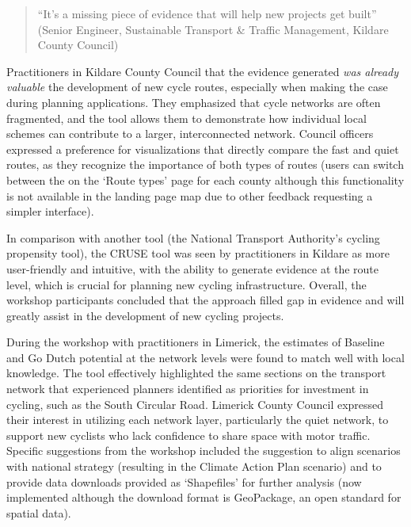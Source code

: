 \documentclass[
  super,
  preprint,
  3p]{elsarticle}
\begin{document}
\begin{quote}
``It's a missing piece of evidence that will help new projects get
built'' (Senior Engineer, Sustainable Transport \& Traffic Management,
Kildare County Council)
\end{quote}

Practitioners in Kildare County Council that the evidence generated
\emph{was already valuable} the development of new cycle routes,
especially when making the case during planning applications. They
emphasized that cycle networks are often fragmented, and the tool allows
them to demonstrate how individual local schemes can contribute to a
larger, interconnected network. Council officers expressed a preference
for visualizations that directly compare the fast and quiet routes, as
they recognize the importance of both types of routes (users can switch
between the on the `Route types' page for each county although this
functionality is not available in the landing page map due to other
feedback requesting a simpler interface).

In comparison with another tool (the National Transport Authority's
cycling propensity tool), the CRUSE tool was seen by practitioners in
Kildare as more user-friendly and intuitive, with the ability to
generate evidence at the route level, which is crucial for planning new
cycling infrastructure. Overall, the workshop participants concluded
that the approach filled gap in evidence and will greatly assist in the
development of new cycling projects.

During the workshop with practitioners in Limerick, the estimates of
Baseline and Go Dutch potential at the network levels were found to
match well with local knowledge. The tool effectively highlighted the
same sections on the transport network that experienced planners
identified as priorities for investment in cycling, such as the South
Circular Road. Limerick County Council expressed their interest in
utilizing each network layer, particularly the quiet network, to support
new cyclists who lack confidence to share space with motor traffic.
Specific suggestions from the workshop included the suggestion to align
scenarios with national strategy (resulting in the Climate Action Plan
scenario) and to provide data downloads provided as `Shapefiles' for
further analysis (now implemented although the download format is
GeoPackage, an open standard for spatial data).
\end{document}
